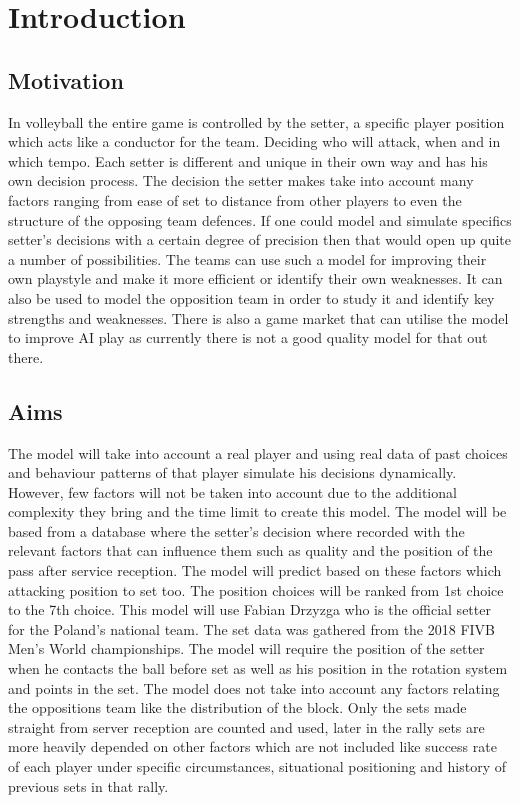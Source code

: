 \documentclass[main.tex]{subfiles}
\begin{document}
  \section{Introduction}
    \subsection{Motivation}
    In volleyball the entire game is controlled by the setter, a specific player position which acts like a conductor for the team. Deciding who will attack, when and in which tempo. Each setter is different and unique in their own way and has his own decision process. The decision the setter makes take into account many factors ranging from ease of set to distance from other players to even the structure of the opposing team defences. If one could model and simulate specifics setter's decisions with a certain degree of precision then that would open up quite a number of possibilities. The teams can use such a model for improving their own playstyle and make it more efficient or identify their own weaknesses. It can also be used to model the opposition team in order to study it and identify key strengths and weaknesses. There is also a game market that can utilise the model to improve AI play as currently there is not a good quality model for that out there.



    \subsection{Aims}
      The model will take into account a real player and using real data of past choices and behaviour patterns of that player simulate his decisions dynamically. However, few factors will not be taken into account due to the additional complexity they bring and the time limit to create this model. The model will be based from a database where the setter’s decision where recorded with the relevant factors that can influence them such as quality and the position of the pass after service reception. The model will predict based on these factors which attacking position to set too. The position choices will be ranked from 1st choice to the 7th choice. This model will use Fabian Drzyzga who is the official setter for the Poland’s national team. The set data was gathered from the 2018 FIVB Men’s World championships. The model will require the position of the setter when he contacts the ball before set as well as his position in the rotation system and points in the set. The model does not take into account any factors relating the oppositions team like the distribution of the block. Only the sets made straight from server reception are counted and used, later in the rally sets are more heavily depended on other factors which are not included like success rate of each player under specific circumstances, situational positioning and history of previous sets in that rally.
\end{document}
